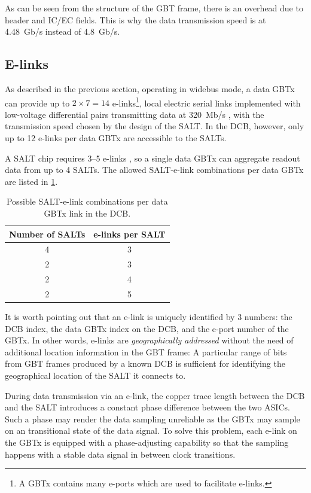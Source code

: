 As can be seen from the structure of the GBT frame, there is an overhead
due to header and IC/EC fields.
This is why the data transmission speed is at 4.48~Gb/s instead of 4.8~Gb/s.


\subsection{E-links}
\label{dcb-elink}

As described in the previous section,
operating in widebus mode,
a data GBTx can provide up to $2 \times 7 = 14$ e-links\footnote{
    A GBTx contains many e-ports which are used to facilitate e-links.
},
local electric serial links implemented with low-voltage differential
pairs transmitting data at 320~Mb/s
\cite{gbtx_manual},
with the transmission speed chosen by the design of the SALT.
In the DCB, however, only up to 12 e-links per data GBTx are accessible to the
SALTs.

A SALT chip requires 3--5 e-links \cite{s22010107},
so a single data GBTx can aggregate readout data from up to 4 SALTs.
The allowed SALT-e-link combinations per data GBTx are listed in
\cref{tab:salt-elink}.

\begin{table}[!htb]
    \centering
    \begin{tabular}{ c | c }
        \toprule
        \textbf{Number of SALTs} & \textbf{e-links per SALT} \\
        \midrule
        4  &  3  \\
        2  &  3  \\
        2  &  4  \\
        2  &  5  \\
        \bottomrule
    \end{tabular}

    \caption{Possible SALT-e-link combinations per data GBTx link in the DCB.}
    \label{tab:salt-elink}
\end{table}

It is worth pointing out that an e-link is uniquely identified by 3 numbers:
the DCB index, the data GBTx index on the DCB, and the e-port number of the
GBTx.
In other words, e-links are \emph{geographically addressed} without the need
of additional location information in the GBT frame:
A particular range of bits from GBT frames produced by a known DCB is sufficient
for identifying the geographical location of the SALT it connects to.

During data transmission via an e-link,
the copper trace length between the DCB and the SALT introduces a constant
phase difference between the two ASICs.
Such a phase may render the data sampling unreliable
as the GBTx may sample on an transitional state of the data signal.
To solve this problem, each e-link on the GBTx is equipped with a
phase-adjusting capability so that the sampling happens with a stable data
signal in between clock transitions.


